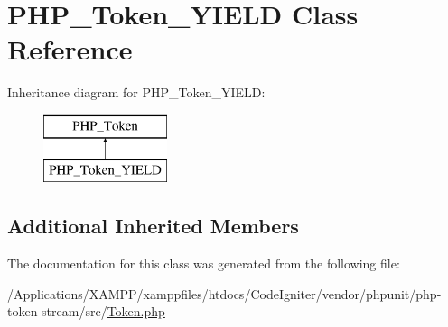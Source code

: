 \hypertarget{class_p_h_p___token___y_i_e_l_d}{}\section{P\+H\+P\+\_\+\+Token\+\_\+\+Y\+I\+E\+LD Class Reference}
\label{class_p_h_p___token___y_i_e_l_d}
Inheritance diagram for P\+H\+P\+\_\+\+Token\+\_\+\+Y\+I\+E\+LD\+:\begin{figure}[H]
\begin{center}
\leavevmode
\includegraphics[height=2.000000cm]{class_p_h_p___token___y_i_e_l_d}
\end{center}
\end{figure}
\subsection*{Additional Inherited Members}


The documentation for this class was generated from the following file\+:\begin{DoxyCompactItemize}
\item 
/\+Applications/\+X\+A\+M\+P\+P/xamppfiles/htdocs/\+Code\+Igniter/vendor/phpunit/php-\/token-\/stream/src/\mbox{\hyperlink{_token_8php}{Token.\+php}}\end{DoxyCompactItemize}
